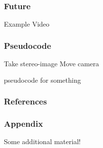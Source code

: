 \documentclass{beamer}
\begin{document}
\begin{frame}
\frametitle{Future}
Example Video
\begin{center}
\end{center}
\end{frame}

\begin{frame}

  \frametitle{Pseudocode}

\begin{algorithm}[H]
  \begin{algorithmic}[1]
    \STATE Take stereo-image
      \RETURN
    \ENDIF
    \STATE Move camera
    \ENDFOR
  \end{algorithmic}
  \caption{pseudocode for something }
\end{algorithm}

\end{frame}

\begin{frame}
  \frametitle{References}


  
  
\end{frame}

\appendix

\begin{frame}
\frametitle{Appendix}
  Some additional material!
\end{frame}
\end{document}
